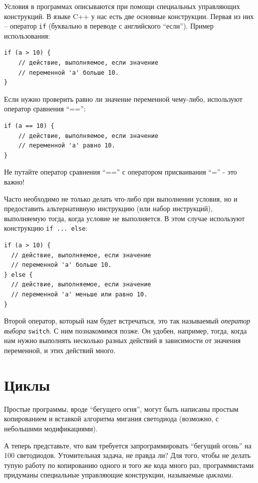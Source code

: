 \documentclass[a4paper,twoside]{book}
\begin{document}
Условия в программах описываются при помощи специальных управляющих конструкций.
В языке C++ у нас есть две основные конструкции. Первая из них -- оператор
\texttt{if} (буквально в переводе с английского ``если''). Пример использования:

\begin{verbatim}
if (a > 10) {
    // действие, выполняемое, если значение
    // переменной 'a' больше 10.
}
\end{verbatim}

Если нужно проверить равно ли значение переменной чему-либо, используют оператор
сравнения ``=='':

\begin{verbatim}
if (a == 10) {
    // действие, выполняемое, если значение
    // переменной 'a' равно 10.
}
\end{verbatim}

Не путайте оператор сравнения ``=='' с оператором присваивания ``='' - это важно!

Часто необходимо не только делать что-либо при выполнении условия, но и
предоставить альтернативную инструкцию (или набор инструкций), выполняемую
тогда, когда условие не выполняется. В этом случае используют конструкцию
\texttt{if ... else}:

\begin{verbatim}
if (a > 10) {
  // действие, выполняемое, если значение
  // переменной 'a' больше 10.
} else {
  // действие, выполняемое, если значение
  // переменной 'a' меньше или равно 10.
}
\end{verbatim}

Второй оператор, который нам будет встречаться, это так называемый
\emph{оператор выбора} \texttt{switch}. С ним познакомимся позже. Он удобен,
например, тогда, когда нам нужно выполнять несколько разных действий в
зависимости от значения переменной, и этих действий много.

\section{Циклы}

Простые программы, вроде ``бегущего огня'', могут быть написаны простым
копированием и вставкой алгоритма мигания светодиода (возможно, с небольшими
модификациями).

А теперь представьте, что вам требуется запрограммировать ``бегущий огонь'' на
100 светодиодов. Утомительная задача, не правда ли? Для того, чтобы не делать
тупую работу по копированию одного и того же кода много раз, программистами
придуманы специальные управляющие конструкции, называемые \emph{циклами}.
\end{document}
